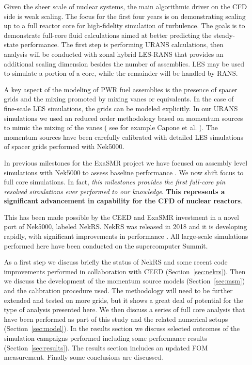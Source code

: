 \documentclass{ecpreportv2}
\begin{document}
Given the sheer scale of nuclear systems, the main algorithmic driver on the CFD side is weak scaling.
The focus for the first four years is  on demonstrating scaling up to a full reactor core for high-fidelity simulation of turbulence. The goals is to demonstrate full-core fluid calculations aimed at better predicting the steady-state performance. The first step is performing URANS calculations, then analysis will be conducted with zonal hybrid LES-RANS that provides an additional scaling dimension besides the number of assemblies. LES may be used to simulate a portion of a core, while the remainder will be handled by RANS.

A key aspect of the modeling of PWR fuel assemblies is the presence of spacer grids and the mixing promoted by mixing vanes or equivalents. In the case of fine-scale LES simulations, the grids can be modeled explicitly. In our URANS simulations we used an reduced order methodology based on momentum sources to mimic the mixing of the vanes ( see for example Capone et al. \cite{Capone2016}). The momentum sources have been carefully calibrated with detailed LES simulations of spacer grids performed with Nek5000.

In previous milestones for the ExaSMR project we have focused on assembly level simulations with Nek5000 to assess baseline performance \cite{merzari2018performance} \cite{merzari2020wall}. We now shift focus to full core simulations. In fact, \textit{this milestones provides the first full-core pin resolved simulations ever performed to our knowledge}. \textbf{This represents a significant advancement in capability for the CFD of nuclear reactors}.

This has been made possible by the CEED and ExaSMR investment in a novel port of Nek5000, labeled NekRS. NekRS was released in 2018 and it is developing rapidly, with significant improvements in performance \cite{merzari2020toward}. All large-scale simulations performed here have been conducted on the supercomputer Summit.

As a first step we discuss briefly the status of NekRS and some recent code improvements performed in collaboration with CEED (Section~\ref{sec:nekrs}).   Then we discuss the development of the momentum source models (Section~\ref{sec:msm}) and the calibration procedure used. The methodology will need to be further extended and tested on more grids, but it shows a great deal of potential for the type of analysis presented here. We then discuss a series of full core analysis that have been performed as part of this study and the related numerical setups (Section~\ref{sec:model}). In the results section we discuss selected outcomes of the simulation campaigns performed including some performance results (Section~\ref{sec:results}). The results section includes an updated FOM measurement. Finally some conclusions are discussed.
\end{document}
